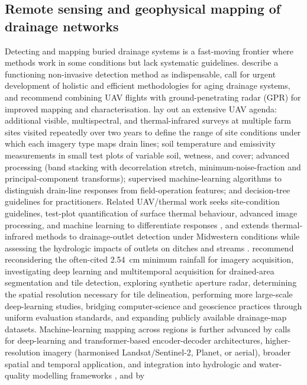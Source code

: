\documentclass[11pt]{article}
\begin{document}
\subsection{Remote sensing and geophysical mapping of drainage networks}

Detecting and mapping buried drainage systems is a fast-moving frontier where
methods work in some conditions but lack systematic guidelines. \textcite{Wienken2024}
describe a functioning non-invasive detection method as indispensable, call for
urgent development of holistic and efficient methodologies for aging drainage
systems, and recommend combining UAV flights with ground-penetrating radar (GPR)
for improved mapping and characterisation. \textcite{Allred2020} lay out an
extensive UAV agenda: additional visible, multispectral, and thermal-infrared
surveys at multiple farm sites visited repeatedly over two years to define the
range of site conditions under which each imagery type maps drain lines; soil
temperature and emissivity measurements in small test plots of variable soil,
wetness, and cover; advanced processing (band stacking with decorrelation stretch,
minimum-noise-fraction and principal-component transforms); supervised
machine-learning algorithms to distinguish drain-line responses from field-operation
features; and decision-tree guidelines for practitioners. Related UAV/thermal work
seeks site-condition guidelines, test-plot quantification of surface thermal
behaviour, advanced image processing, and machine learning to differentiate
responses \parencite{Allred2021}, and extends thermal-infrared methods
to drainage-outlet detection under Midwestern conditions while assessing the
hydrologic impacts of outlets on ditches and streams \parencite{Allred2022}.
\textcite{Carlsen2024} recommend reconsidering the often-cited 2.54~cm minimum
rainfall for imagery acquisition, investigating deep learning and multitemporal
acquisition for drained-area segmentation and tile detection, exploring synthetic
aperture radar, determining the spatial resolution necessary for tile delineation,
performing more large-scale deep-learning studies, bridging computer-science and
geoscience practices through uniform evaluation standards, and expanding publicly
available drainage-map datasets. Machine-learning mapping across regions is further
advanced by calls for deep-learning and transformer-based encoder-decoder
architectures, higher-resolution imagery (harmonised Landsat/Sentinel-2, Planet,
or aerial), broader spatial and temporal application, and integration into
hydrologic and water-quality modelling frameworks \parencite{Wan2024}, and by
\end{document}

